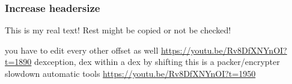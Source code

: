 \subsubsection{Increase headersize} \label{subsubsection:counter-reengineering-break-headersize}
This is my real text! Rest might be copied or not be checked!


you have to edit every other offset as well\newline
\url{https://youtu.be/Rv8DfXNYnOI?t=1890}\newline
dexception, dex within a dex by shifting\newline
this is a packer/encrypter\newline
slowdown automatic tools\newline
\url{https://youtu.be/Rv8DfXNYnOI?t=1950}\newline

